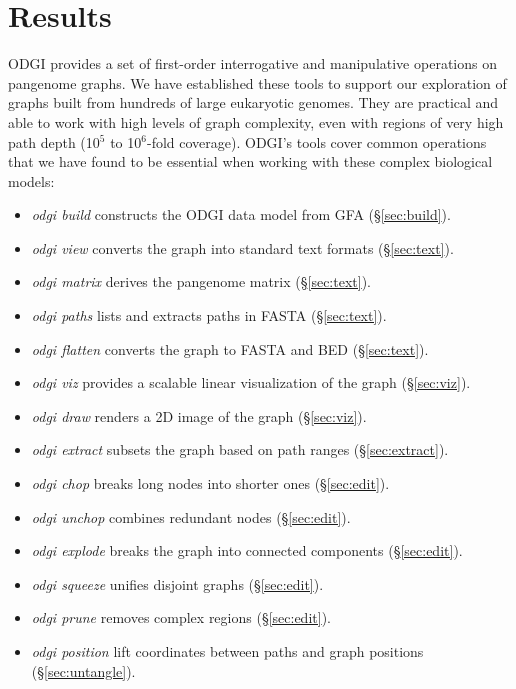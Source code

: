 \documentclass{bioinfo}
\begin{document}


\section{Results}

ODGI provides a set of first-order interrogative and manipulative operations on pangenome graphs.
We have established these tools to support our exploration of graphs built from hundreds of large eukaryotic genomes.
They are practical and able to work with high levels of graph complexity, even with regions of very high path depth (10$^5$ to 10$^6$-fold coverage).
ODGI's tools cover common operations that we have found to be essential when working with these complex biological models:

\begin{itemize}
\item \textit{odgi build} constructs the ODGI data model from GFA (\S\ref{sec:build}).
\item \textit{odgi view} converts the graph into standard text formats (\S\ref{sec:text}).
\item \textit{odgi matrix} derives the pangenome matrix (\S\ref{sec:text}).
\item \textit{odgi paths} lists and extracts paths in FASTA (\S\ref{sec:text}).
\item \textit{odgi flatten} converts the graph to FASTA and BED (\S\ref{sec:text}).
\item \textit{odgi viz} provides a scalable linear visualization of the graph (\S\ref{sec:viz}).
\item \textit{odgi draw} renders a 2D image of the graph (\S\ref{sec:viz}).
\item \textit{odgi extract} subsets the graph based on path ranges (\S\ref{sec:extract}).
\item \textit{odgi chop} breaks long nodes into shorter ones (\S\ref{sec:edit}).
\item \textit{odgi unchop} combines redundant nodes (\S\ref{sec:edit}).
\item \textit{odgi explode} breaks the graph into connected components (\S\ref{sec:edit}).
\item \textit{odgi squeeze} unifies disjoint graphs (\S\ref{sec:edit}).
\item \textit{odgi prune} removes complex regions (\S\ref{sec:edit}).
\item \textit{odgi position} lift coordinates between paths and graph positions (\S\ref{sec:untangle}).

\end{itemize}
\end{document}
